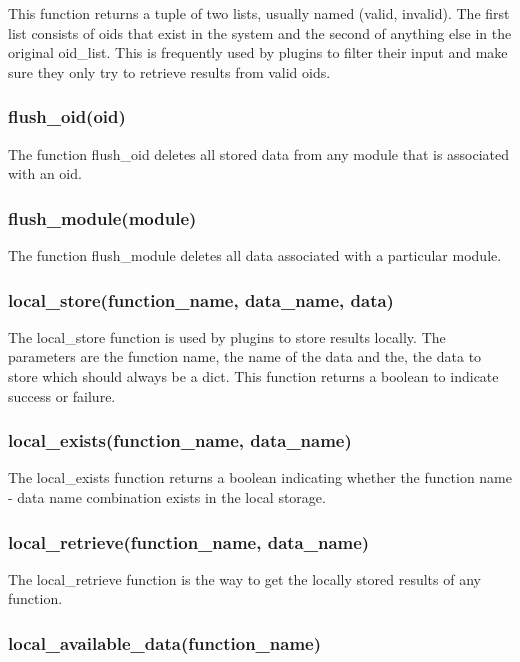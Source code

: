 \documentclass{book}
\begin{document}
This function returns a tuple of two lists, usually named (valid, invalid).  The first list consists of oids that exist in the system and the second of anything else in the original oid\_list.  This is frequently used by plugins to filter their input and make sure they only try to retrieve results from valid oids.

\subsubsection{flush\_oid(oid)}

The function flush\_oid deletes all stored data from any module that is associated with an oid.

\subsubsection{flush\_module(module)}

The function flush\_module deletes all data associated with a particular module.

\subsubsection{local\_store(function\_name, data\_name, data)}

The local\_store function is used by plugins to store results locally. The parameters are the function name, the name of the data and the, the data to store which should always be a dict. This function returns a boolean to indicate success or failure.

\subsubsection{local\_exists(function\_name, data\_name)}

The local\_exists function returns a boolean indicating whether the function name - data name combination exists in the local storage.

\subsubsection{local\_retrieve(function\_name, data\_name)}

The local\_retrieve function is the way to get the locally stored results of any function. 

\subsubsection{local\_available\_data(function\_name)}
\end{document}

